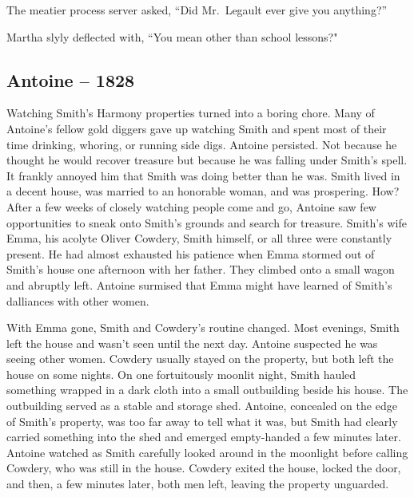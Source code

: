 The meatier process server asked, ``Did Mr.~Legault ever give you
anything?''

Martha slyly deflected with, ``You mean other than school lessons?"

\hypertarget{antoine-1828-1}{%
\subsection*{Antoine -- 1828}\label{antoine-1828-1}}

Watching Smith's Harmony properties turned into a boring chore. Many of
Antoine's fellow gold diggers gave up watching Smith and spent most of
their time drinking, whoring, or running side digs. Antoine persisted.
Not because he thought he would recover treasure but because he was
falling under Smith's spell. It frankly annoyed him that Smith was doing
better than he was. Smith lived in a decent house, was married to an
honorable woman, and was prospering. How? After a few weeks of closely
watching people come and go, Antoine saw few opportunities to sneak onto
Smith's grounds and search for treasure. Smith's wife Emma, his acolyte
Oliver Cowdery, Smith himself, or all three were constantly present. He
had almost exhausted his patience when Emma stormed out of Smith's house
one afternoon with her father. They climbed onto a small wagon and
abruptly left. Antoine surmised that Emma might have learned of Smith's
dalliances with other women.

With Emma gone, Smith and Cowdery's routine changed. Most evenings,
Smith left the house and wasn't seen until the next day. Antoine
suspected he was seeing other women. Cowdery usually stayed on the
property, but both left the house on some nights. On one fortuitously
moonlit night, Smith hauled something wrapped in a dark cloth into a
small outbuilding beside his house. The outbuilding served as a stable
and storage shed. Antoine, concealed on the edge of Smith's property,
was too far away to tell what it was, but Smith had clearly carried
something into the shed and emerged empty-handed a few minutes later.
Antoine watched as Smith carefully looked around in the moonlight before
calling Cowdery, who was still in the house. Cowdery exited the house,
locked the door, and then, a few minutes later, both men left, leaving
the property unguarded.

